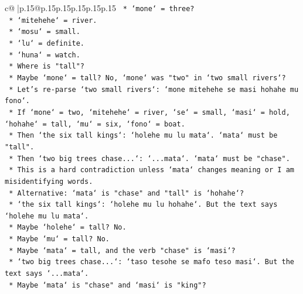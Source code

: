 \documentclass{article}
\begin{document}
{\begin{supertabular}{c@{$\;$}|p{.15\linewidth}@{}p{.15\linewidth}p{.15\linewidth}p{.15\linewidth}p{.15\linewidth}p{.15\linewidth}}
{{{\texttt{                            *   `mone` = three?} \\
\texttt{                            *   `mitehehe` = river.} \\
\texttt{                            *   `mosu` = small.} \\
\texttt{                            *   `lu` = definite.} \\
\texttt{                            *   `huna` = watch.} \\
\texttt{                            *   Where is "tall"?} \\
\texttt{                            *   Maybe `mone` = tall? No, `mone` was "two" in `two small rivers`?} \\
\texttt{                            *   Let's re{-}parse `two small rivers`: `mone mitehehe se masi hohahe mu fono`.} \\
\texttt{                                *   If `mone` = two, `mitehehe` = river, `se` = small, `masi` = hold, `hohahe` = tall, `mu` = six, `fono` = boat.} \\
\texttt{                                *   Then `the six tall kings`: `holehe mu lu mata`. `mata` must be "tall".} \\
\texttt{                                *   Then `two big trees chase...`: `...mata`. `mata` must be "chase".} \\
\texttt{                                *   This is a hard contradiction unless `mata` changes meaning or I am misidentifying words.} \\
\texttt{                                *   Alternative: `mata` is "chase" and "tall" is `hohahe`?} \\
\texttt{                                    *   `the six tall kings`: `holehe mu lu hohahe`. But the text says `holehe mu lu mata`.} \\
\texttt{                                    *   Maybe `holehe` = tall? No.} \\
\texttt{                                    *   Maybe `mu` = tall? No.} \\
\texttt{                                    *   Maybe `mata` = tall, and the verb "chase" is `masi`?} \\
\texttt{                                        *   `two big trees chase...`: `taso tesohe se mafo teso masi`. But the text says `...mata`.} \\
\texttt{                                        *   Maybe `mata` is "chase" and `masi` is "king"?} \\
}}}
\end{supertabular}}
\end{document}
